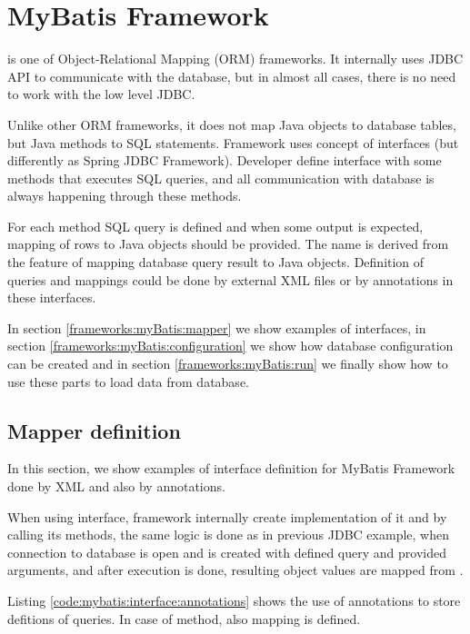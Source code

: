 \section{MyBatis Framework \label{frameworks:myBatis}}

\citet{MyBatis} is one of Object-Relational Mapping (ORM) frameworks.
It internally uses JDBC API to communicate with the database, but in almost all cases,
there is no need to work with the low level JDBC.

Unlike other ORM frameworks, it does not map Java objects to database tables, but Java methods
to SQL statements. Framework uses concept of  interfaces (but differently as Spring JDBC Framework).
Developer define  interface with some methods that executes SQL queries,
and all communication with database is always happening through these methods.

For each method SQL query is defined and when some output is expected,
mapping of rows to Java objects should be provided.
The name  is derived from the feature of mapping database query result
to Java objects.
Definition of queries and mappings could be done by external XML files or by annotations in these interfaces.

In section \ref{frameworks:myBatis:mapper} we show examples of  interfaces,
in section \ref{frameworks:myBatis:configuration} we show how database configuration
can be created and in section \ref{frameworks:myBatis:run} we finally show how to
use these parts to load data from database.




\subsection{Mapper definition \label{frameworks:myBatis:mapper}}

In this section, we show examples of  interface definition
for MyBatis Framework done by XML and also by annotations.

When using  interface, framework internally create implementation
of it and by calling its methods, the same logic is done as
in previous JDBC example, when connection to database is open
and  is created with defined query and provided arguments,
and after execution is done, resulting object values are mapped from .

Listing \ref{code:mybatis:interface:annotations} shows the use of annotations
to store defitions of queries. In case of  method, also mapping is defined.

